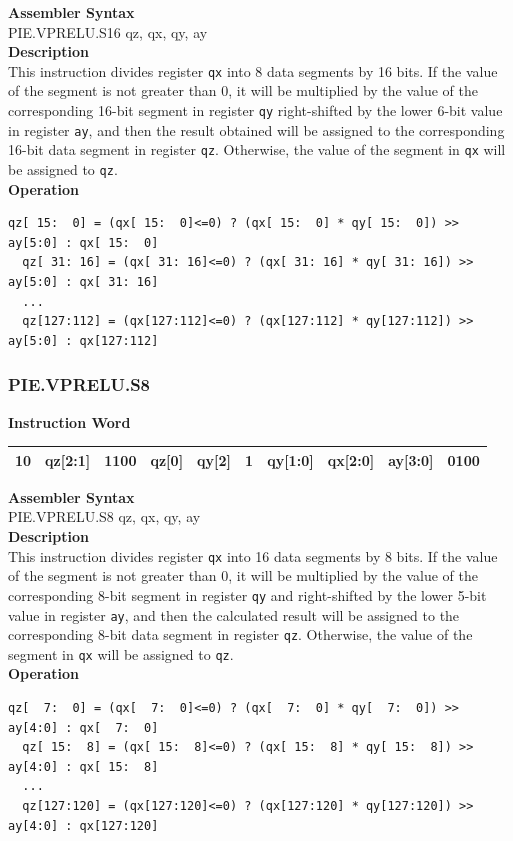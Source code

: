 \textbf{Assembler Syntax} \\
PIE.VPRELU.S16 qz, qx, qy, ay \\
\textbf{Description} \\
This instruction divides register \lstinline{qx} into 8 data segments by 16 bits. If the value of the segment is not greater than 0, it will be multiplied by the value of the corresponding 16-bit segment in register \lstinline{qy} right-shifted by the lower 6-bit value in register \lstinline{ay}, and then the result obtained will be assigned to the corresponding 16-bit data segment in register \lstinline{qz}. Otherwise, the value of the segment in \lstinline{qx} will be assigned to \lstinline{qz}.\\
\textbf{Operation}
\begin{lstlisting}[escapeinside=`?]
  qz[ 15:  0] = (qx[ 15:  0]<=0) ? (qx[ 15:  0] * qy[ 15:  0]) >> ay[5:0] : qx[ 15:  0]
  qz[ 31: 16] = (qx[ 31: 16]<=0) ? (qx[ 31: 16] * qy[ 31: 16]) >> ay[5:0] : qx[ 31: 16]
  ...
  qz[127:112] = (qx[127:112]<=0) ? (qx[127:112] * qy[127:112]) >> ay[5:0] : qx[127:112]
\end{lstlisting}

\newpage
\subsubsection{PIE.VPRELU.S8}\label{instruction:PIEVPRELUS8}
\setlength\tabcolsep{6pt}
\textbf{Instruction Word} \\
\begin{tabular}{|c|c|c|c|c|c|c|c|c|c|}
	\hline
	10 & qz[2:1] & 1100 & qz[0] & qy[2] & 1 & qy[1:0] & qx[2:0] & ay[3:0] & 0100 \\
	\hline
\end{tabular}

\textbf{Assembler Syntax} \\
PIE.VPRELU.S8 qz, qx, qy, ay \\
\textbf{Description} \\
This instruction divides register \lstinline{qx} into 16 data segments by 8 bits. If the value of the segment is not greater than 0, it will be multiplied by the value of the corresponding 8-bit segment in register \lstinline{qy} and right-shifted by the lower 5-bit value in register \lstinline{ay}, and then the calculated result will be assigned to the corresponding 8-bit data segment in register \lstinline{qz}. Otherwise, the value of the segment in \lstinline{qx} will be assigned to \lstinline{qz}.\\
\textbf{Operation}
\begin{lstlisting}[escapeinside=`?]
  qz[  7:  0] = (qx[  7:  0]<=0) ? (qx[  7:  0] * qy[  7:  0]) >> ay[4:0] : qx[  7:  0]
  qz[ 15:  8] = (qx[ 15:  8]<=0) ? (qx[ 15:  8] * qy[ 15:  8]) >> ay[4:0] : qx[ 15:  8]
  ...
  qz[127:120] = (qx[127:120]<=0) ? (qx[127:120] * qy[127:120]) >> ay[4:0] : qx[127:120]
\end{lstlisting}

